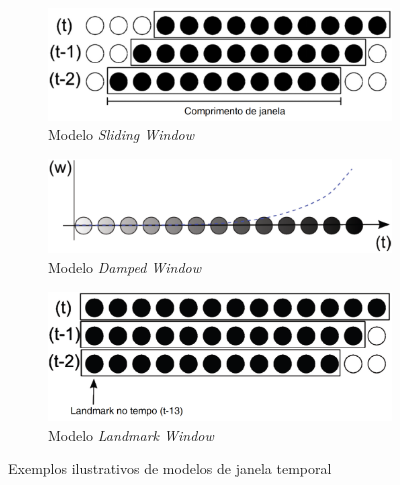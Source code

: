 \begin{figure}[!htb]
        \centering
        \begin{subfigure}[t]{0.4\textwidth}
                \includegraphics[width=\textwidth]{figures/slidingWindow}
                \caption{Modelo \emph{Sliding Window}}
                \label{Fig:slidingWindow}
        \end{subfigure}%
        \qquad %
        \begin{subfigure}[t]{0.4\textwidth}
                \includegraphics[width=\textwidth]{figures/dampedWindow}
                \caption{Modelo \emph{Damped Window}}
                \label{Fig:dampedWindow}
        \end{subfigure}
        \qquad %
        \begin{subfigure}[t]{0.4\textwidth}
        		\includegraphics[width=\textwidth]{figures/landmarkWindow}
        		\caption{Modelo \emph{Landmark Window}}
        		\label{Fig:landmarkWindow}
        \end{subfigure}
        \caption{Exemplos ilustrativos de modelos de janela temporal \cite{Silva2013}}\label{Fig:modeloJanelas}
\end{figure}

